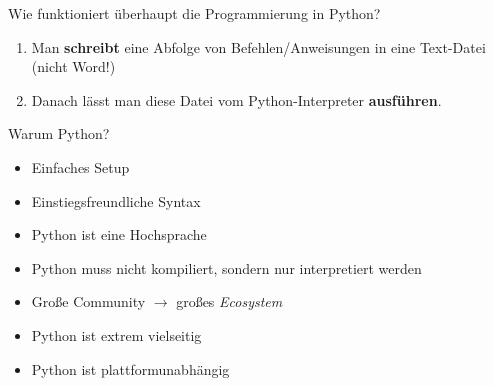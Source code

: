 \begin{frame}

\begin{block}{Wie funktioniert überhaupt die Programmierung in Python?}
	
	\begin{enumerate}
		\item Man \textbf{schreibt} eine Abfolge von Befehlen/Anweisungen in eine Text-Datei (nicht Word!) 
		\item Danach lässt man diese Datei vom Python-Interpreter \textbf{ausführen}. 
	\end{enumerate}
\end{block}
\end{frame}

\begin{frame}
\end{frame}

\begin{frame}
	\begin{block}{Warum Python?}
		\begin{itemize}
			\item Einfaches Setup
			\item Einstiegsfreundliche Syntax
			\item Python ist eine Hochsprache
			\item Python muss nicht kompiliert, sondern nur interpretiert werden
			\item Große Community $\rightarrow$ großes \emph{Ecosystem}
			\item Python ist extrem vielseitig
			\item Python ist plattformunabhängig
		\end{itemize}
	\end{block}
\end{frame}

